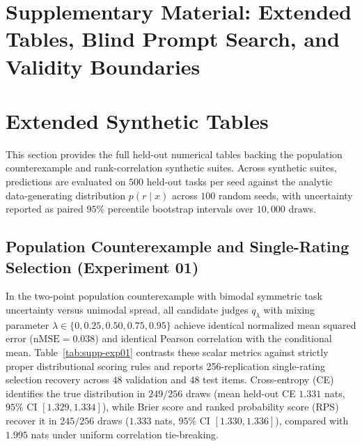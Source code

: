 
\FloatBarrier
\clearpage
\setcounter{section}{0}
\renewcommand{\thesection}{S\arabic{section}}
\setcounter{table}{0}
\renewcommand{\thetable}{S\arabic{table}}
\setcounter{figure}{0}
\renewcommand{\thefigure}{S\arabic{figure}}

\section*{Supplementary Material: Extended Tables, Blind Prompt Search, and Validity Boundaries}

\section{Extended Synthetic Tables}
\label{sec:supp-toy}

This section provides the full held-out numerical tables backing the population counterexample and rank-correlation synthetic suites.
Across synthetic suites, predictions are evaluated on $500$ held-out tasks per seed against the analytic data-generating distribution $p(r \mid x)$ across $100$ random seeds, with uncertainty reported as paired $95\%$ percentile bootstrap intervals over $10{,}000$ draws.

\subsection{Population Counterexample and Single-Rating Selection (Experiment 01)}
In the two-point population counterexample with bimodal symmetric task uncertainty versus unimodal spread, all candidate judges $q_\lambda$ with mixing parameter $\lambda \in \{0, 0.25, 0.50, 0.75, 0.95\}$ achieve identical normalized mean squared error ($\mathrm{nMSE} = 0.038$) and identical Pearson correlation with the conditional mean.
Table~\ref{tab:supp-exp01} contrasts these scalar metrics against strictly proper distributional scoring rules and reports 256-replication single-rating selection recovery across $48$ validation and $48$ test items.
Cross-entropy (CE) identifies the true distribution in $249/256$ draws (mean held-out CE $1.331$ nats, $95\%$ CI $[1.329, 1.334]$), while Brier score and ranked probability score (RPS) recover it in $245/256$ draws ($1.333$ nats, $95\%$ CI $[1.330, 1.336]$), compared with $1.995$ nats under uniform correlation tie-breaking.


